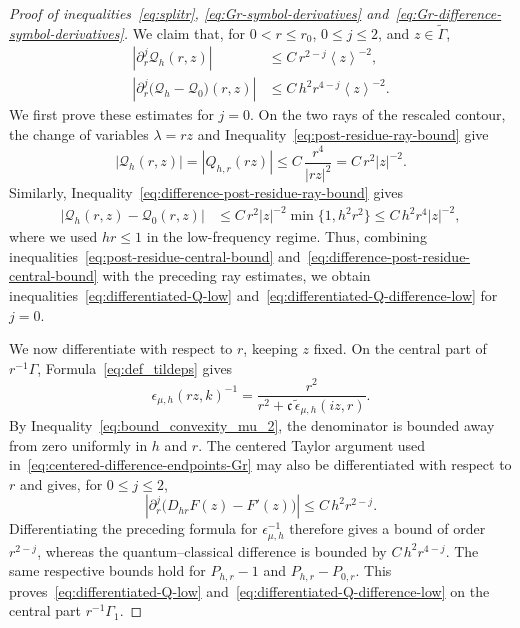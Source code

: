 \documentclass[a4paper,12pt]{amsart} %
\theoremstyle{plain}
\theoremstyle{definition}
\newcommand		{\lt}			{\left}				%
\newcommand		{\rt}			{\right}			%
\renewcommand	{\(}			{\lt(}
\renewcommand	{\)}			{\rt)}
\newcommand		{\bangle}[1]	{\lt\langle #1\rt\rangle}
\newcommand		{\weight}[1]	{\bangle{#1}}	%
\newcommand		{\n}[1]			{\lt\lvert{#1}\rt\rvert}	%
\newcommand	{\h}			{h}
\newcommand		{\CK}			{\mathfrak{c}}	%
\begin{document}
\begin{proof}[Proof of inequalities~\eqref{eq:splitr}, \eqref{eq:Gr-symbol-derivatives} and~\eqref{eq:Gr-difference-symbol-derivatives}]
		We claim that, for $0<r\leq r_0$, $0\leq j\leq2$, and $z\in\widetilde\Gamma$,
		\begin{align}\label{eq:differentiated-Q-low}
			\n{\partial_r^j\mathscr Q_\h(r,z)} &\leq C \, r^{2-j} \weight{z}^{-2},
			\\ \label{eq:differentiated-Q-difference-low}
			\n{\partial_r^j \bigl(\mathscr Q_\h-\mathscr Q_0\bigr)(r,z)} &\leq C \, h^2 r^{4-j} \weight{z}^{-2} .
		\end{align}
		We first prove these estimates for $j=0$. On the two rays of the rescaled contour, the change of variables $\lambda = r z$ and Inequality~\eqref{eq:post-residue-ray-bound} give
		\begin{equation*}
			\n{\mathscr Q_\h(r,z)} =\n{Q_{\h,r}(rz)} \leq C \, \frac{r^4}{\n{rz}^2} = C \, r^2 \n{z}^{-2} .
		\end{equation*}
		Similarly, Inequality~\eqref{eq:difference-post-residue-ray-bound} gives
		\begin{align*}
			\n{\mathscr Q_\h(r,z)-\mathscr Q_0(r,z)} &\leq C \, r^2\n{z}^{-2} \min\{1,h^2r^2\} \leq C \, h^2 r^4 \n{z}^{-2},
		\end{align*}
		where we used $hr\leq1$ in the low-frequency regime. Thus, combining inequalities~\eqref{eq:post-residue-central-bound} and~\eqref{eq:difference-post-residue-central-bound} with the preceding ray estimates, we obtain inequalities~\eqref{eq:differentiated-Q-low} and~\eqref{eq:differentiated-Q-difference-low} for $j=0$.

		We now differentiate with respect to $r$, keeping $z$ fixed. On the
		central part of $r^{-1}\Gamma$, Formula~\eqref{eq:def_tildeps} gives
		\begin{equation*}
			\epsilon_{\mu,\h}(rz,k)^{-1} =\frac{r^2}{r^2+\CK\,\widetilde\epsilon_{\mu,\h}(iz,r)}.
		\end{equation*}
		By Inequality~\eqref{eq:bound_convexity_mu_2}, the denominator is bounded away
		from zero uniformly in $h$ and $r$. The centered Taylor argument used
		in~\eqref{eq:centered-difference-endpoints-Gr} may also be
		differentiated with respect to $r$ and gives, for $0\leq j\leq2$,
		\begin{equation}\label{eq:differentiated-centered-difference}
			\n{\partial_r^j \bigl(D_{hr}F(z)-F'(z)\bigr)} \leq C \, h^2r^{2-j}.
		\end{equation}
		Differentiating the preceding formula for $\epsilon_{\mu,\h}^{-1}$ therefore gives a bound of order $r^{2-j}$, whereas the quantum--classical difference is bounded by $C\, h^2 r^{4-j}$. The same respective bounds hold for $P_{\h,r}-1$ and $P_{\h,r}-P_{0,r}$. This proves~\eqref{eq:differentiated-Q-low} and~\eqref{eq:differentiated-Q-difference-low} on the central part $r^{-1}\Gamma_1$.


\end{proof}
\end{document}
